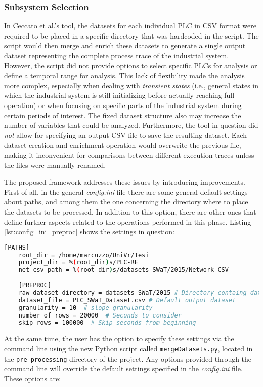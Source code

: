 \subsubsection{Subsystem Selection}
\label{subsubsec:4_select_subsystem}
In Ceccato et al.'s tool, the datasets for each individual PLC in CSV format were required to be placed in a specific directory that was hardcoded in the script. The script would then merge and enrich these datasets to generate a single output dataset representing the complete process trace of the industrial system. However, the script did not provide options to select specific PLCs for analysis or define a temporal range for analysis. This lack of flexibility made the analysis more complex, especially when dealing with \textit{transient states} (i.e., general states in which the industrial system is still initializing before actually reaching full operation) or when focusing on specific parts of the industrial system during certain periods of interest. The fixed dataset structure also may increase the number of variables that could be analyzed.\newline
Furthermore, the tool in question did \textit{not} allow for specifying an output CSV file to save the resulting dataset. Each dataset creation and enrichment operation would overwrite the previous file, making it inconvenient for comparisons between different execution traces unless the files were manually renamed.

\bigskip
The proposed framework addresses these issues by introducing improvements. First of all, in the general \textit{config.ini} file there are some general default settings about paths, and among them the one concerning the directory where to place the datasets %
to be processed. In addition to this option, there are other ones that define further aspects related to the operations performed in this phase. Listing \ref{lst:config_ini_preproc} shows the settings in question: 

\begin{lstlisting}[language=bash, numbers=none, caption=Paths and parameters for the Pre-processing phase in \textit{config.ini} file, label=lst:config_ini_preproc]	
	[PATHS]
	root_dir = /home/marcuzzo/UniVr/Tesi
	project_dir = %(root_dir)s/PLC-RE
	net_csv_path = %(root_dir)s/datasets_SWaT/2015/Network_CSV
	
	[PREPROC]
	raw_dataset_directory = datasets_SWaT/2015 # Directory containg datasets
	dataset_file = PLC_SWaT_Dataset.csv # Default output dataset
	granularity = 10  # slope granularity
	number_of_rows = 20000  # Seconds to consider
	skip_rows = 100000  # Skip seconds from beginning
\end{lstlisting}
At the same time, the user has the option to specify these settings via the command line using the new Python script called \texttt{mergeDatasets.py}, located in the \texttt{pre-processing} directory of the project. Any options provided through the command line will override the default settings specified in the \textit{config.ini} file. These options are:

